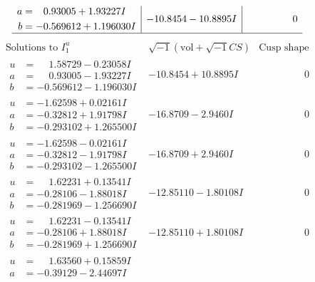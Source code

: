 \documentclass[1p]{elsarticle_modified}
\theoremstyle{definition}
\newcommand{\I}{\sqrt{-1}}
\begin{document}
$$\begin{array}{c|c|c}
\begin{aligned}
a &= \phantom{-}0.93005 + 1.93227 I \\
b &= -0.569612 + 1.196030 I\end{aligned}
 & -10.8454 - 10.8895 I & \phantom{-0.000000 } 0\\
 \hline 
 \end{array}$$\newpage$$\begin{array}{c|c|c}  
\text{Solutions to }I^u_{1}& \I (\text{vol} + \sqrt{-1}CS) & \text{Cusp shape}\\
 \hline 
\begin{aligned}
u &= \phantom{-}1.58729 - 0.23058 I \\
a &= \phantom{-}0.93005 - 1.93227 I \\
b &= -0.569612 - 1.196030 I\end{aligned}
 & -10.8454 + 10.8895 I & \phantom{-0.000000 } 0 \\ \hline\begin{aligned}
u &= -1.62598 + 0.02161 I \\
a &= -0.32812 + 1.91798 I \\
b &= -0.293102 + 1.265500 I\end{aligned}
 & -16.8709 - 2.9460 I & \phantom{-0.000000 } 0 \\ \hline\begin{aligned}
u &= -1.62598 - 0.02161 I \\
a &= -0.32812 - 1.91798 I \\
b &= -0.293102 - 1.265500 I\end{aligned}
 & -16.8709 + 2.9460 I & \phantom{-0.000000 } 0 \\ \hline\begin{aligned}
u &= \phantom{-}1.62231 + 0.13541 I \\
a &= -0.28106 - 1.88018 I \\
b &= -0.281969 - 1.256690 I\end{aligned}
 & -12.85110 - 1.80108 I & \phantom{-0.000000 } 0 \\ \hline\begin{aligned}
u &= \phantom{-}1.62231 - 0.13541 I \\
a &= -0.28106 + 1.88018 I \\
b &= -0.281969 + 1.256690 I\end{aligned}
 & -12.85110 + 1.80108 I & \phantom{-0.000000 } 0 \\ \hline\begin{aligned}
u &= \phantom{-}1.63560 + 0.15859 I \\
a &= -0.39129 - 2.44697 I \\

\end{aligned}
\end{array}$$
\end{document}
